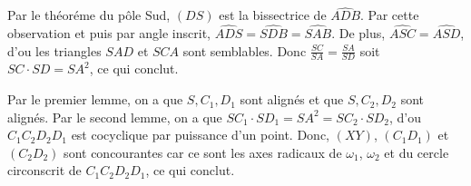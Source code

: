 \begin{sol}
\begin{preuve}
Par le théoréme du pôle Sud, $\left(DS\right)$ est la bissectrice de $\widehat{ADB}$. Par cette observation et puis par angle inscrit, $\widehat{ADS} = \widehat{SDB} = \widehat{SAB}$. De plus, $\widehat{ASC} = \widehat{ASD}$, d'ou les triangles $SAD$ et $SCA$ sont semblables. Donc $\frac{SC}{SA} = \frac{SA}{SD}$ soit $SC\cdot SD = SA^2$, ce qui conclut.
\end{preuve}

\begin{center}
\end{center}

Par le premier lemme, on a que $S, C_1, D_1$ sont alignés et que $S, C_2, D_2$ sont alignés. Par le second lemme, on a que $S C_1 \cdot S D_1 = S A ^2 = S C_2 \cdot S D_2$, d'ou $C_1 C_2 D_2 D_1$ est cocyclique par puissance d'un point. Donc, $\left(XY\right)$, $\left(C_1 D_1\right)$ et $\left(C_2 D_2\right)$ sont concourantes car ce sont les axes radicaux de $\omega_1$, $\omega_2$ et du cercle circonscrit de $C_1 C_2 D_2 D_1$, ce qui conclut.
\end{sol}